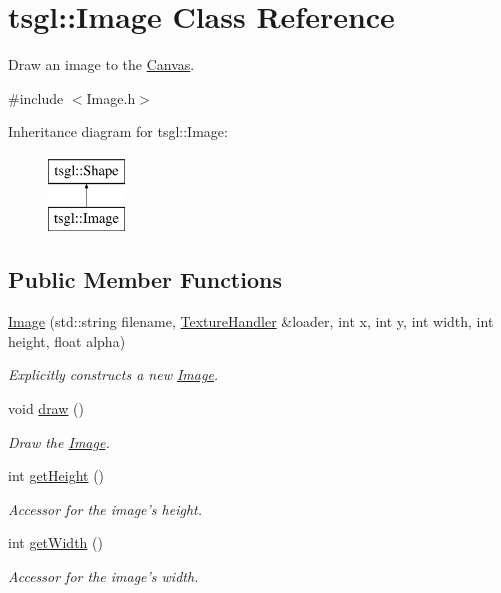 \hypertarget{classtsgl_1_1_image}{\section{tsgl\-:\-:Image Class Reference}
\label{classtsgl_1_1_image}
}


Draw an image to the \hyperlink{classtsgl_1_1_canvas}{Canvas}.  




{\ttfamily \#include $<$Image.\-h$>$}

Inheritance diagram for tsgl\-:\-:Image\-:\begin{figure}[H]
\begin{center}
\leavevmode
\includegraphics[height=2.000000cm]{classtsgl_1_1_image}
\end{center}
\end{figure}
\subsection*{Public Member Functions}
\begin{DoxyCompactItemize}
\item 
\hyperlink{classtsgl_1_1_image_a497894a4dbfa46d1e3aefd7dbe086cc3}{Image} (std\-::string filename, \hyperlink{classtsgl_1_1_texture_handler}{Texture\-Handler} \&loader, int x, int y, int width, int height, float alpha)
\begin{DoxyCompactList}\small\item\em Explicitly constructs a new \hyperlink{classtsgl_1_1_image}{Image}. \end{DoxyCompactList}\item 
void \hyperlink{classtsgl_1_1_image_a85732de312b98dd5ce5a9cc319bbf8c5}{draw} ()
\begin{DoxyCompactList}\small\item\em Draw the \hyperlink{classtsgl_1_1_image}{Image}. \end{DoxyCompactList}\item 
int \hyperlink{classtsgl_1_1_image_afa939262dcf32c9a504efe30a8de5c58}{get\-Height} ()
\begin{DoxyCompactList}\small\item\em Accessor for the image's height. \end{DoxyCompactList}\item 
int \hyperlink{classtsgl_1_1_image_af01d5f815b91f20fd441f9bcec671d79}{get\-Width} ()
\begin{DoxyCompactList}\small\item\em Accessor for the image's width. \end{DoxyCompactList}\end{DoxyCompactItemize}
